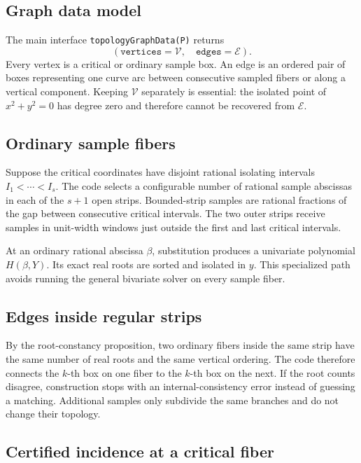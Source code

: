 \documentclass[11pt,a4paper]{article}
\begin{document}
\subsection{Graph data model}

The main interface \texttt{topologyGraphData(P)} returns
\[
  (\texttt{vertices}=\mathcal{V},\quad
   \texttt{edges}=\mathcal{E}).
\]
Every vertex is a critical or ordinary sample box. An edge is an ordered pair
of boxes representing one curve arc between consecutive sampled fibers or
along a vertical component. Keeping $\mathcal{V}$ separately is essential:
the isolated point of $x^2+y^2=0$ has degree zero and therefore cannot be
recovered from $\mathcal{E}$.

\subsection{Ordinary sample fibers}

Suppose the critical coordinates have disjoint rational isolating intervals
$I_1<\cdots<I_s$. The code selects a configurable number of rational sample
abscissas in each of the $s+1$ open strips. Bounded-strip samples are rational
fractions of the gap between consecutive critical intervals. The two outer
strips receive samples in unit-width windows just outside the first and last
critical intervals.

At an ordinary rational abscissa $\beta$, substitution produces a univariate
polynomial $H(\beta,Y)$. Its exact real roots are sorted and isolated in
$y$. This specialized path avoids running the general bivariate solver on
every sample fiber.

\subsection{Edges inside regular strips}

By the root-constancy proposition, two ordinary fibers inside the same strip
have the same number of real roots and the same vertical ordering. The code
therefore connects the $k$-th box on one fiber to the $k$-th box on the next.
If the root counts disagree, construction stops with an internal-consistency
error instead of guessing a matching. Additional samples only subdivide the
same branches and do not change their topology.

\subsection{Certified incidence at a critical fiber}
\end{document}
